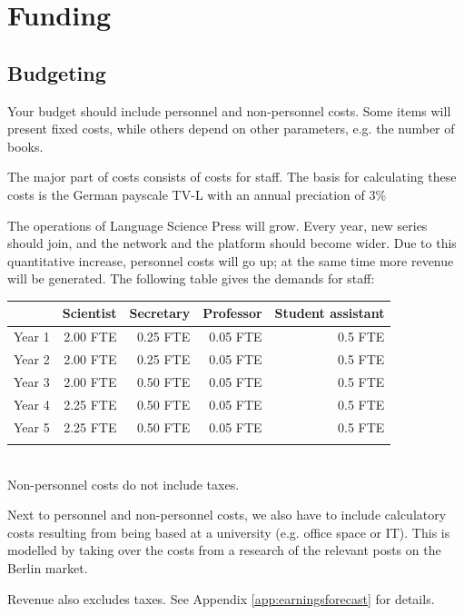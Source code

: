 \documentclass[nonflat,smallfont
]{langsci/langscibook}
\newcommand{\background}[1]{ 
  \vspace{5mm}
  \renewcommand{\tblslinecolour}{lsDarkBlue}
  \tblssy[red]{explore2}{Background}{\vspace*{-5mm}#1}
}
\newcommand{\langscisolution}[1]{
  \renewcommand{\tblslinecolour}{lsLightBlue}
  \tblssy{langsci}{LangSci solution}{\vspace*{-5mm}#1}
}
\renewcommand{\tblssy}[4][black!12]{%
  \renewcommand{\langscisymbol}{#2}\renewcommand{\tblsboxcolor}{#1}
  \begin{mdframed}[style=yellowexercise,frametitle={#3}]
    #4
  \end{mdframed}
}
\begin{document}
\chapter{Funding}

\section{Budgeting}
\vspace*{5mm}
\background{Your budget should include personnel and non-personnel costs. Some items will present fixed costs, while others depend on other parameters, e.g. the number of books.}
\langscisolution{
The major part of costs consists of costs for staff. The basis for calculating these costs is the German payscale TV-L with an annual preciation of 3\%

The operations of Language Science Press will grow. Every year, new series should join, and the network and the platform should become wider. Due to this quantitative increase, personnel costs will go up; at the same time more revenue will be generated. The following table gives the demands for staff:%
 
\noindent
\begin{tabularx}{\textwidth}{Xrrrr}
\lsptoprule
         &  Scientist  & Secretary &   Professor &   Student assistant  \\
\midrule
Year 1 &  2.00 FTE                 &    0.25 FTE                       &   0.05 FTE    &   0.5 FTE                  \\
Year 2 &  2.00 FTE                 &    0.25 FTE                       &   0.05 FTE    &   0.5 FTE                  \\
Year 3 &  2.00 FTE                 &    0.50 FTE                        &   0.05 FTE    &   0.5 FTE                  \\
Year 4 &  2.25 FTE              &    0.50 FTE                        &   0.05 FTE    &   0.5 FTE                  \\
Year 5 &  2.25 FTE              &    0.50 FTE                        &   0.05 FTE    &   0.5 FTE                  \\
\lspbottomrule
\end{tabularx}\\

Non-personnel costs do not include taxes. 

Next to personnel and non-personnel costs, we also have to include calculatory costs resulting from being based at a university (e.g. office space or IT). This is modelled by taking over the costs from a research of the relevant posts on the Berlin market. 

Revenue also excludes taxes. See Appendix \ref{app:earningsforecast} for details.
}
\end{document}
